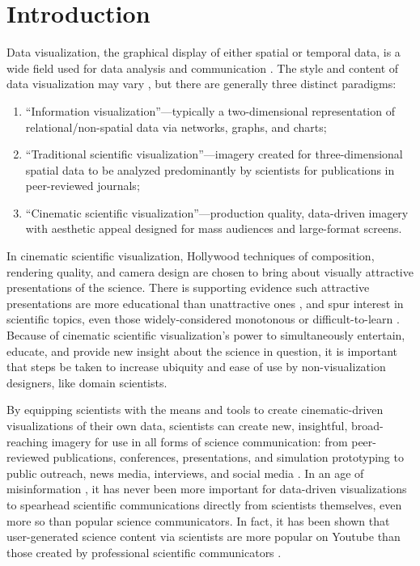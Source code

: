 \documentclass[fleqn,usenatbib,useAMS]{mnras}
\begin{document}

\section{Introduction} \label{sec:intro}

Data visualization, the graphical display of either spatial or temporal data, is a wide field used for data analysis and communication \citep[\& references therein]{Borkiewicz19a, Borkiewicz19b, Punzo15, Hassan11, Barnes08, Price07}. The style and content of data visualization may vary \citep{Borkiewicz19a, Goodman12}, but there are generally three distinct paradigms: 
\begin{enumerate}
    \item ``Information visualization''---typically a two-dimensional representation of relational/non-spatial data via networks, graphs, and charts;
    \item  ``Traditional scientific visualization''---imagery created for three-dimensional spatial data to be analyzed predominantly by scientists for publications in peer-reviewed journals;
    \item ``Cinematic scientific visualization''---production quality, data-driven imagery with aesthetic appeal designed for mass audiences and large-format screens. 
\end{enumerate}

In cinematic scientific visualization, Hollywood techniques of composition, rendering quality, and camera design are chosen to bring about visually attractive presentations of the science. There is supporting evidence such attractive presentations are more educational than unattractive ones \citep{Cawthon07}, and spur interest in scientific topics, even those widely-considered monotonous or difficult-to-learn \citep{Arroio10, Dubeck94}. Because of cinematic scientific visualization's power to simultaneously entertain, educate, and provide new insight about the science in question, it is important that steps be taken to increase ubiquity and ease of use by non-visualization designers, like domain scientists. \par

By equipping scientists with the means and tools to create cinematic-driven visualizations of their own data, scientists can create new, insightful, broad-reaching imagery for use in all forms of science communication: from peer-reviewed publications, conferences, presentations, and simulation prototyping to public outreach, news media, interviews, and social media \citep{Borkiewicz19a, Shih19}. In an age of misinformation \citep{Borkiewicz17}, it has never been more important for data-driven visualizations to spearhead scientific communications directly from scientists themselves, even more so than popular science communicators. In fact, it has been shown that user-generated science content via scientists are more popular on Youtube than those created by professional scientific communicators \citep{Welbourne16}. \par
\end{document}

